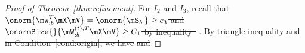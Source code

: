 \documentclass[lettersize,onecolumn,journal]{IEEEtran}
\theoremstyle{definition}
\theoremstyle{definition}
\providecommand{\DIFdeltex}[1]{{\protect\color{red}\sout{#1}}}                      %
\providecommand{\DIFdel}[1]{\texorpdfstring{\DIFdeltex{#1}}{}} %
\begin{document}
\begin{proof}[Proof of Theorem~\ref{thm:refinement}]
\DIFdel{For $I_2$ and $I_3$, recall that $\onorm{\mW_{:b}^T \mX \mV} = \onorm{\mS_{b:}} \geq c_3$ and $\onormSize{}{  \mW_{:b}^{(t),T} \mX \mV } \geq C_1$ by inequality~}%
\DIFdel{. By triangle inequality and }%
\DIFdel{in Condition~\ref{cond:origin}, we have 
    }%
\DIFdel{and 
    }%




\end{proof}
\end{document}
